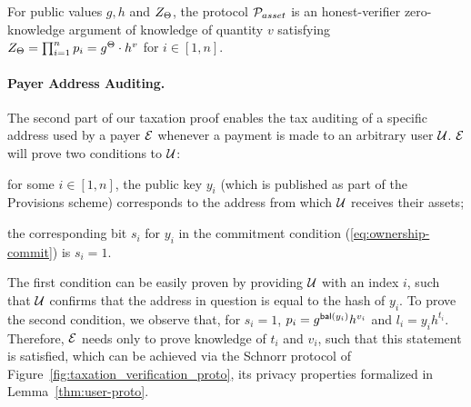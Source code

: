 

\begin{lemma}\label{thm:tax-auth-proto}
    For public values $g, h$ and $Z_\Theta$, the protocol $\mathcal{P}_{asset}$ is an
    honest-verifier zero-knowledge argument of knowledge of quantity $v$
    satisfying
    $Z_\Theta = \prod_{i = 1}^n p_i = g^{\Theta} \cdot h^v$ for $i \in [1, n]$.
\end{lemma}

\paragraph{Payer Address Auditing.}\label{subsec:user-verification-proto}
The second part of our taxation proof enables the tax auditing of a specific
address used by a payer $\mathcal{E}$ whenever a payment is made to an arbitrary  user $\mathcal{U}$. $\mathcal{E}$ will prove two conditions to
$\mathcal{U}$:
\begin{inparaenum}[i)]
    \item for some $i \in [1, n]$, the public key $y_i$ (which is published as
        part of the Provisions scheme) corresponds to the address from which
        $\mathcal{U}$ receives their assets;
    \item the corresponding bit $s_i$ for $y_i$ in the commitment condition
        (\ref{eq:ownership-commit}) is $s_i = 1$.
\end{inparaenum}
The first condition can be easily proven by providing $\mathcal{U}$ with an index
$i$, such that $\mathcal{U}$ confirms that the address in question is equal to the
hash of $y_i$. To prove the second condition, we observe that, for $s_i = 1$,
$p_i = g^{\mathsf{bal}(y_i)}h^{v_i}$ and
$l_i = y_ih^{t_i}$.
Therefore, $\mathcal{E}$ needs only to prove knowledge of $t_i$ and $v_i$, such that this
statement is satisfied, which can be achieved via the Schnorr protocol
of Figure~\ref{fig:taxation_verification_proto}, its privacy properties formalized in
Lemma~\ref{thm:user-proto}.

